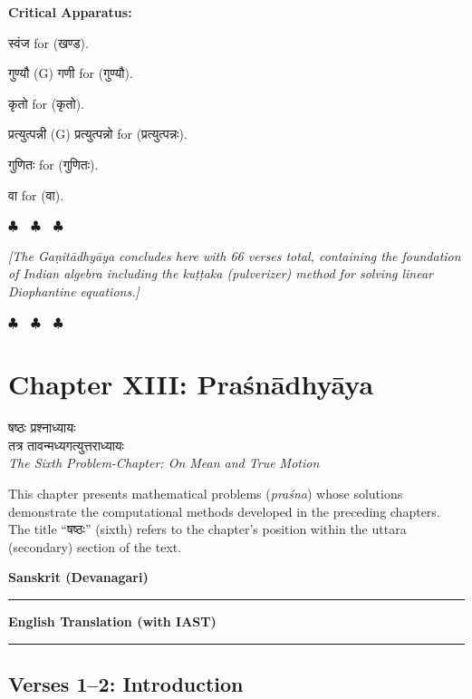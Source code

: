 \documentclass[11pt,a4paper]{article}
\newcommand{\dev}[1]{{\devanagarifont #1}}
\newcommand{\columnheaders}{%
  \noindent
  \begin{minipage}[t]{0.47\textwidth}
  \centering
  \textbf{\large Sanskrit (Devanagari)}\\[0.1cm]
  \rule{0.8\textwidth}{0.5pt}
  \end{minipage}%
  \hfill
  \begin{minipage}[t]{0.47\textwidth}
  \centering
  \textbf{\large English Translation (with IAST)}\\[0.1cm]
  \rule{0.8\textwidth}{0.5pt}
  \end{minipage}%
  \vspace{0.3cm}
  \par
}
\newenvironment{variants}{%
  \small%
  \color{varecolor}%
  \list{}{\leftmargin=2em\itemindent=-1em}%
}{\endlist}
\newcommand{\chapterend}{%
  \begin{center}%
  \textcolor{endmarkcolor}{$\clubsuit$~~$\clubsuit$~~$\clubsuit$}%
  \end{center}%
}
\begin{document}
\vspace{0.4cm}
\textcolor{varecolor}{\textbf{Critical Apparatus:}}
\begin{variants}
\item[45.1] \dev{स्वंज} \dev{for} (\dev{खण्ड}).
\item[45.2] \dev{गुण्यौ} (G) \dev{गणी} \dev{for} (\dev{गुण्यौ}).
\item[45.3] \dev{कृतो} \dev{for} (\dev{कृतो}).
\item[45.4] \dev{प्रत्युत्पन्नी} (G) \dev{प्रत्युत्पन्नो} \dev{for} (\dev{प्रत्युत्पन्नः}).
\item[45.5] \dev{गुणितः} \dev{for} (\dev{गुणितः}).
\item[45.6] \dev{वा} \dev{for} (\dev{वा}).
\end{variants}

\vspace{0.5cm}
\chapterend
\textit{[The Gaṇitādhyāya concludes here with 66 verses total, containing the
foundation of Indian algebra including the \textit{kuṭṭaka} (pulverizer) method for
solving linear Diophantine equations.]}
\chapterend

\newpage


\section*{Chapter XIII: Praśnādhyāya}

\begin{center}
\dev{षष्ठः प्रश्नाध्यायः}\\[0.2cm]
\dev{तत्र तावन्मध्यगत्युत्तराध्यायः}\\[0.3cm]
\textit{The Sixth Problem-Chapter: On Mean and True Motion}
\end{center}

This chapter presents mathematical problems (\textit{praśna}) whose solutions
demonstrate the computational methods developed in the preceding chapters. The
title ``\dev{षष्ठः}'' (sixth) refers to the chapter's position within the uttara
(secondary) section of the text.

\vspace{0.3cm}
\columnheaders

\subsection*{Verses 1--2: Introduction}
\end{document}
